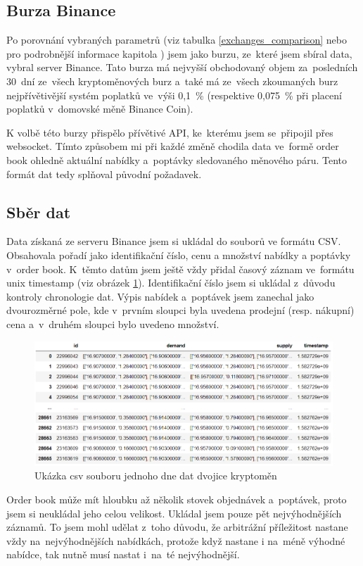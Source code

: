 \documentclass[thesis=B,czech]{FITthesis}[2019/03/21]
\begin{document}
\subsection{Burza Binance}
Po porovnání vybraných parametrů (viz tabulka \ref{exchanges_comparison} nebo pro podrobnější informace kapitola ) jsem jako burzu, ze~které jsem sbíral data, vybral server Binance. Tato burza má nejvyšší obchodovaný objem za~posledních 30~dní ze~všech kryptoměnových burz \cite{coinmarketcap} a~také má ze~všech zkoumaných burz nejpřívětivější systém poplatků ve~výši 0,1~\% (respektive 0,075~\% při placení poplatků v~domovské měně Binance Coin).

K volbě této burzy přispělo přívětivé API, ke~kterému jsem se~připojil přes websocket. \cite{BinanceApi} Tímto způsobem mi při každé změně chodila data ve~formě order book ohledně aktuální nabídky a~poptávky sledovaného měnového páru. Tento formát dat tedy splňoval původní požadavek. \cite{BinanceApi}

\subsection{Sběr dat}
Data získaná ze serveru Binance jsem si ukládal do souborů ve formátu CSV. Obsahovala pořadí jako identifikační číslo, cenu a množství nabídky a poptávky v~order book. K~těmto datům jsem ještě vždy přidal časový záznam ve~formátu unix timestamp (viz obrázek \ref{csv_data}). Identifikační číslo jsem si ukládal z~důvodu kontroly chronologie dat. Výpis nabídek a~poptávek jsem zanechal jako dvourozměrné pole, kde v~prvním sloupci byla uvedena prodejní (resp. nákupní) cena a~v~druhém sloupci bylo uvedeno množství.

\begin{figure}\centering
	\includegraphics[width=1\textwidth]{images/csv_data.PNG}
	\caption{Ukázka csv souboru jednoho dne dat dvojice kryptoměn}\label{csv_data}
\end{figure}
Order book může mít hloubku až několik stovek objednávek a~poptávek, proto jsem si neukládal jeho celou velikost. Ukládal jsem pouze pět nejvýhodnějších záznamů. To jsem mohl udělat z~toho důvodu, že arbitrážní příležitost nastane vždy na~nejvýhodnějších nabídkách, protože když nastane i na~méně výhodné nabídce, tak nutně musí nastat i~na~té nejvýhodnější. 
\end{document}
